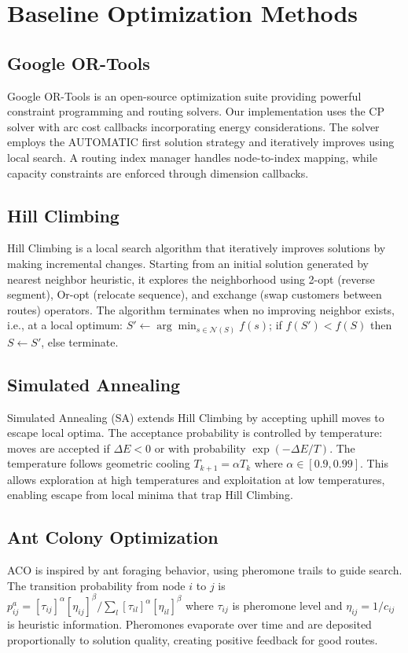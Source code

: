 \documentclass[10pt,a4paper]{article}
\begin{document}
\section{Baseline Optimization Methods}
\subsection{Google OR-Tools}
Google OR-Tools is an open-source optimization suite providing powerful constraint programming and routing solvers. Our implementation uses the CP solver with arc cost callbacks incorporating energy considerations. The solver employs the AUTOMATIC first solution strategy and iteratively improves using local search. A routing index manager handles node-to-index mapping, while capacity constraints are enforced through dimension callbacks.
\subsection{Hill Climbing}
Hill Climbing is a local search algorithm that iteratively improves solutions by making incremental changes. Starting from an initial solution generated by nearest neighbor heuristic, it explores the neighborhood using 2-opt (reverse segment), Or-opt (relocate sequence), and exchange (swap customers between routes) operators. The algorithm terminates when no improving neighbor exists, i.e., at a local optimum: $S' \gets \arg\min_{s\in\mathcal{N}(S)} f(s)$; if $f(S') < f(S)$ then $S \gets S'$, else terminate.
\subsection{Simulated Annealing}
Simulated Annealing (SA) extends Hill Climbing by accepting uphill moves to escape local optima. The acceptance probability is controlled by temperature: moves are accepted if $\Delta E < 0$ or with probability $\exp(-\Delta E/T)$. The temperature follows geometric cooling $T_{k+1} = \alpha T_k$ where $\alpha \in [0.9, 0.99]$. This allows exploration at high temperatures and exploitation at low temperatures, enabling escape from local minima that trap Hill Climbing.
\subsection{Ant Colony Optimization}
ACO is inspired by ant foraging behavior, using pheromone trails to guide search. The transition probability from node $i$ to $j$ is $p_{ij}^a = [\tau_{ij}]^\alpha[\eta_{ij}]^\beta / \sum_l[\tau_{il}]^\alpha[\eta_{il}]^\beta$ where $\tau_{ij}$ is pheromone level and $\eta_{ij} = 1/c_{ij}$ is heuristic information. Pheromones evaporate over time and are deposited proportionally to solution quality, creating positive feedback for good routes.
\end{document}
